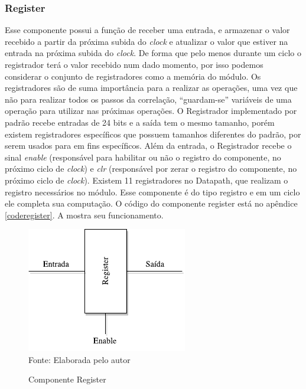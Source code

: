 \subsubsection{Register}
Esse componente possui a função de receber uma entrada, e armazenar o valor recebido a partir da próxima subida do \textit{clock} e atualizar o valor que estiver na entrada na próxima subida do \textit{clock}. De forma que pelo menos durante um ciclo o registrador terá o valor recebido num dado momento, por isso podemos considerar o conjunto de registradores como a memória do módulo. Os registradores são de suma importância para a realizar as operações, uma vez que não para realizar todos os passos da correlação, “guardam-se” variáveis de uma operação para utilizar nas próximas operações. O Registrador implementado por padrão recebe entradas de 24 bits e a saída tem o mesmo tamanho, porém existem registradores específicos que possuem tamanhos diferentes do padrão, por serem usados para em fins específicos. Além da entrada, o Registrador recebe o sinal \textit{enable} (responsável para habilitar ou não o registro do componente, no próximo ciclo de \textit{clock}) e \textit{clr} (responsável por zerar o registro do componente, no próximo ciclo de \textit{clock}). Existem 11 registradores no Datapath, que realizam o registro necessários no módulo. Esse componente é do tipo registro e em um ciclo ele completa sua computação. O código do componente register está no apêndice \ref{coderegister}. A  mostra seu funcionamento.

\begin{figure}[H]
	\centering
	\caption{Componente Register}
	\includegraphics[width=7cm]{figures/Register.pdf}\\
	
	{Fonte: Elaborada pelo autor}
	\label{register}
\end{figure}

